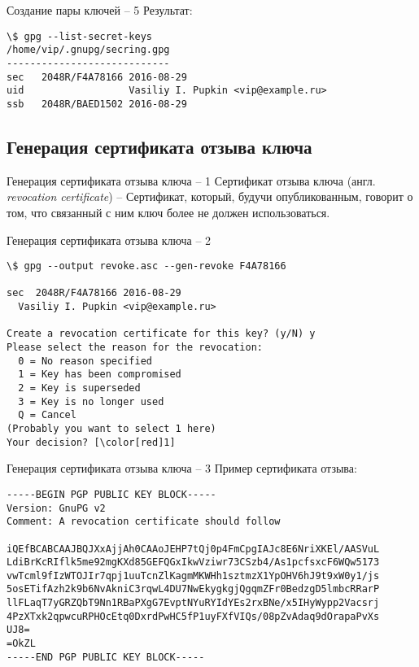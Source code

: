\documentclass[presentation]{beamer}
\begin{document}
\begin{frame}[fragile]{Создание пары ключей -- 5}
  Результат:
  \begin{Verbatim}[commandchars=\\\[\]]
\$ gpg --list-secret-keys
/home/vip/.gnupg/secring.gpg
----------------------------
sec   2048R/F4A78166 2016-08-29
uid                  Vasiliy I. Pupkin <vip@example.ru>
ssb   2048R/BAED1502 2016-08-29
  \end{Verbatim}
\end{frame}


\subsection{Генерация сертификата отзыва ключа}

\begin{frame}[fragile]{Генерация сертификата отзыва ключа -- 1}
  \raisebox{-.30em}{\Large\HandRight}\hspace{.25em} Сертификат отзыва
  ключа (англ. \emph{revocation certificate}) -- Сертификат, который,
  будучи опубликованным, говорит о том, что связанный с ним ключ более
  не должен использоваться.\newline\newline
\end{frame}

\begin{frame}[fragile]{Генерация сертификата отзыва ключа -- 2}
\begin{Verbatim}[commandchars=\\\[\]]
\$ gpg --output revoke.asc --gen-revoke F4A78166

sec  2048R/F4A78166 2016-08-29
  Vasiliy I. Pupkin <vip@example.ru>

Create a revocation certificate for this key? (y/N) y
Please select the reason for the revocation:
  0 = No reason specified
  1 = Key has been compromised
  2 = Key is superseded
  3 = Key is no longer used
  Q = Cancel
(Probably you want to select 1 here)
Your decision? [\color[red]1]
\end{Verbatim}
\end{frame}

\begin{frame}[fragile]{Генерация сертификата отзыва ключа -- 3}
  Пример сертификата отзыва:\newline
\footnotesize
\begin{Verbatim}[commandchars=\\\[\]]
-----BEGIN PGP PUBLIC KEY BLOCK-----
Version: GnuPG v2
Comment: A revocation certificate should follow

iQEfBCABCAAJBQJXxAjjAh0CAAoJEHP7tQj0p4FmCpgIAJc8E6NriXKEl/AASVuL
LdiBrKcRIflk5me92mgKXd85GEFQGxIkwVziwr73CSzb4/As1pcfsxcF6WQw5173
vwTcml9fIzWTOJIr7qpj1uuTcnZlKagmMKWHh1sztmzX1YpOHV6hJ9t9xW0y1/js
5osETifAzh2k9b6NvAkniC3rqwL4DU7NwEkygkgjQgqmZFr0BedzgD5lmbcRRarP
llFLaqT7yGRZQbT9Nn1RBaPXgG7EvptNYuRYIdYEs2rxBNe/x5IHyWypp2Vacsrj
4PzXTxk2qpwcuRPHOcEtq0DxrdPwHC5fP1uyFXfVIQs/08pZvAdaq9dOrapaPvXs
UJ8=
=OkZL
-----END PGP PUBLIC KEY BLOCK-----
\end{Verbatim}
\normalsize
\end{frame}
\end{document}
